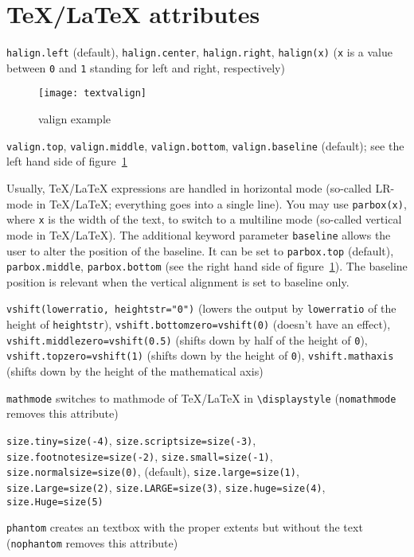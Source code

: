 \section[TeX/LaTeX attributes]{\TeX/\LaTeX{} attributes}

\begin{description}
\raggedright
\item[Horizontal alignment:] \verb|halign.left| (default),
\verb|halign.center|, \verb|halign.right|, \verb|halign(x)| (\verb|x|
is a value between \verb|0| and \verb|1| standing for left and right,
respectively)
\begin{figure}
\centerline{\texttt{[image: textvalign]}}
\caption{valign example}
\label{fig:textvalign}
\end{figure}
\item[Vertical alignment:] \verb|valign.top|, \verb|valign.middle|,
\verb|valign.bottom|, \verb|valign.baseline| (default); see the left
hand side of figure~\ref{fig:textvalign}
\item[Vertical box:] Usually, \TeX/\LaTeX{} expressions are handled in
horizontal mode (so-called LR-mode in \TeX/\LaTeX; everything goes
into a single line). You may use \verb|parbox(x)|, where \verb|x| is the
width of the text, to switch to a multiline mode (so-called vertical
mode in \TeX/\LaTeX). The additional keyword parameter \verb|baseline|
allows the user to alter the position of the baseline. It can be set
to \verb|parbox.top| (default), \verb|parbox.middle|,
\verb|parbox.bottom| (see the right hand side of
figure~\ref{fig:textvalign}). The baseline position is relevant when
the vertical alignment is set to baseline only.
\item[Vertical shift:] \verb|vshift(lowerratio, heightstr="0")|
(lowers the output by \verb|lowerratio| of the height of
\verb|heightstr|), \verb|vshift.bottomzero=vshift(0)| (doesn't have an
effect), \verb|vshift.middlezero=vshift(0.5)| (shifts down by half of
the height of \verb|0|), \verb|vshift.topzero=vshift(1)| (shifts down
by the height of \verb|0|), \verb|vshift.mathaxis| (shifts down by the
height of the mathematical axis)
\item[Mathmode:] \verb|mathmode| switches to mathmode of \TeX/\LaTeX{}
in \verb|\displaystyle| (\verb|nomathmode| removes this attribute)
\item[Font size:] \verb|size.tiny=size(-4)|,
\verb|size.scriptsize=size(-3)|, \verb|size.footnotesize=size(-2)|,
\verb|size.small=size(-1)|, \verb|size.normalsize=size(0)|,
(default), \verb|size.large=size(1)|, \verb|size.Large=size(2)|,
\verb|size.LARGE=size(3)|, \verb|size.huge=size(4)|,
\verb|size.Huge=size(5)|
\item[Phantom text:] \verb|phantom| creates an textbox with the proper
extents but without the text (\verb|nophantom| removes this attribute)
\end{description}

